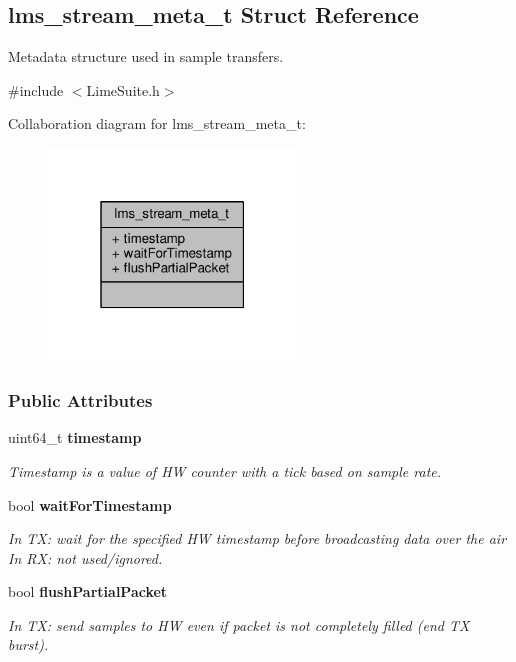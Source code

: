 \subsection{lms\+\_\+stream\+\_\+meta\+\_\+t Struct Reference}
\label{structlms__stream__meta__t}


Metadata structure used in sample transfers.  




{\ttfamily \#include $<$Lime\+Suite.\+h$>$}



Collaboration diagram for lms\+\_\+stream\+\_\+meta\+\_\+t\+:
\nopagebreak
\begin{figure}[H]
\begin{center}
\leavevmode
\includegraphics[width=187pt]{de/d16/structlms__stream__meta__t__coll__graph}
\end{center}
\end{figure}
\subsubsection*{Public Attributes}
\begin{DoxyCompactItemize}
\item 
uint64\+\_\+t {\bf timestamp}
\begin{DoxyCompactList}\small\item\em Timestamp is a value of HW counter with a tick based on sample rate. \end{DoxyCompactList}\item 
bool {\bf wait\+For\+Timestamp}
\begin{DoxyCompactList}\small\item\em In TX\+: wait for the specified HW timestamp before broadcasting data over the air In RX\+: not used/ignored. \end{DoxyCompactList}\item 
bool {\bf flush\+Partial\+Packet}
\begin{DoxyCompactList}\small\item\em In TX\+: send samples to HW even if packet is not completely filled (end TX burst). \end{DoxyCompactList}\end{DoxyCompactItemize}


